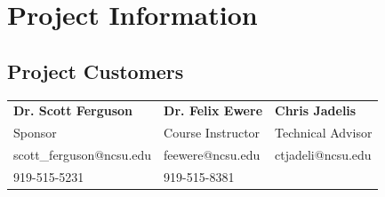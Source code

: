 
\section{Project Information}
\subsection{Project Customers}

\begin{center}
    \begin{tabular}{|l||l||l|}
        \hline
         \textbf{Dr. Scott Ferguson} & \textbf{Dr. Felix Ewere} & \textbf{Chris Jadelis} \\
         
         Sponsor & Course Instructor & Technical Advisor \\
         
         scott\_ferguson@ncsu.edu & feewere@ncsu.edu & ctjadeli@ncsu.edu \\
         
         919-515-5231 & 919-515-8381 &  \\
         \hline
    \end{tabular}

\end{center}


